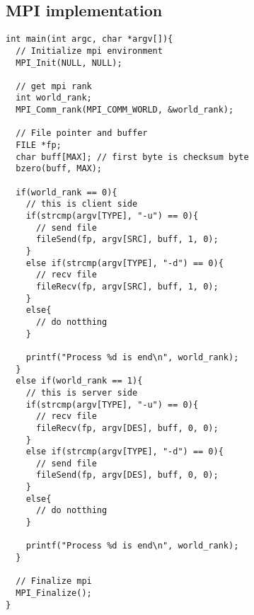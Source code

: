 \documentclass{article}
\begin{document}
\subsection{MPI implementation}
\begin{lstlisting}
int main(int argc, char *argv[]){
  // Initialize mpi environment
  MPI_Init(NULL, NULL);

  // get mpi rank
  int world_rank;
  MPI_Comm_rank(MPI_COMM_WORLD, &world_rank);

  // File pointer and buffer
  FILE *fp;
  char buff[MAX]; // first byte is checksum byte
  bzero(buff, MAX);

  if(world_rank == 0){
    // this is client side
    if(strcmp(argv[TYPE], "-u") == 0){
      // send file
      fileSend(fp, argv[SRC], buff, 1, 0);
    }
    else if(strcmp(argv[TYPE], "-d") == 0){
      // recv file
      fileRecv(fp, argv[SRC], buff, 1, 0);
    }
    else{
      // do notthing
    }

    printf("Process %d is end\n", world_rank);
  }
  else if(world_rank == 1){
    // this is server side
    if(strcmp(argv[TYPE], "-u") == 0){
      // recv file
      fileRecv(fp, argv[DES], buff, 0, 0);
    }
    else if(strcmp(argv[TYPE], "-d") == 0){
      // send file
      fileSend(fp, argv[DES], buff, 0, 0);
    }
    else{
      // do notthing
    }
    
    printf("Process %d is end\n", world_rank);
  }

  // Finalize mpi
  MPI_Finalize();
}
\end{lstlisting}
\end{document}
